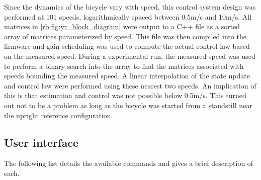 Since the dynamics of the bicycle vary with speed, this control system design
was performed at 101 speeds, logarithmically spaced between 0.5m/s and 10m/s.
All matrices in \autoref{rb:fig:yr_block_diagram} were output to a C++ file as
a sorted array of matrices parameterized by speed. This file was then compiled
into the firmware and gain scheduling was used to compute the actual control
law based on the measured speed. During a experimental run, the measured speed
was used to perform a binary search into the array to find the matrices
associated with speeds bounding the measured speed. A linear interpolation of
the state update and control law were performed using these nearest two speeds.
An implication of this is that estimation and control was not possible below
0.5m/s. This turned out not to be a problem as long as the bicycle was started
from a standstill near the upright reference configuration.

\subsection{User interface} \label{rb:subsec:ui}
The following list details the available commands and gives a brief description
of each.

